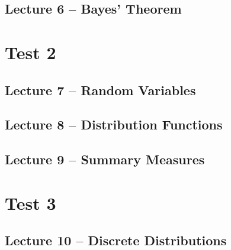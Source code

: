 \documentclass{article}
\begin{document}
\subsection{Lecture 6 -- Bayes' Theorem}
\newpage

\section{Test 2}

\secttoc

\subsection{Lecture 7 -- Random Variables}
\newpage

\subsection{Lecture 8 -- Distribution Functions}
\newpage

\subsection{Lecture 9 -- Summary Measures}
\newpage

\section{Test 3}

\secttoc

\subsection{Lecture 10 -- Discrete Distributions}
\newpage

\end{document}
